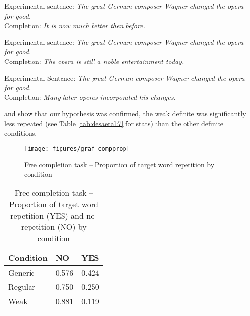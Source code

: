 \documentclass[output=paper,
modfonts
]{langscibook}
\begin{document}
\ea \label{ex:desaetal:11}
{Experimental sentence:} \textit{The great German composer Wagner changed the opera for good.}
\\ {Completion:} \textit{It is now much better then before.} 
\z

\ea \label{ex:desaetal:12}
{Experimental sentence:} \textit{The great German composer Wagner changed the opera for good.}	
\\ {Completion:} \textit{The opera is still a noble entertainment today.}
\z

\ea \label{ex:desaetal:13}
{Experimental Sentence:} \textit{The great German composer Wagner changed the opera for good.}
\\  {Completion:} \textit{Many later operas incorporated his changes.} 
\z

 and  show that our hypothesis was confirmed, the weak definite was significantly less repeated (see Table \ref{tab:desaetal:7} for stats) than the other definite conditions.

\begin{figure}[p]
\centering
\texttt{[image: figures/graf\_compprop]}
\caption{Free completion task -- Proportion of target word repetition by condition}
\label{fig:desaetal:9}
\end{figure}

\begin{table}[p]
\centering
\caption{Free completion task -- Proportion of target word repetition (YES) and no-repetition (NO) by condition}
\label{tab:desaetal:6}
\begin{tabularx}{0.5\textwidth}{XXX}
\lsptoprule
{Condition} & {NO} & {YES} \\
\midrule
Generic & 0.576 & 0.424 \\ 
Regular & 0.750 & 0.250 \\ 
Weak & 0.881 & 0.119 \\
\lspbottomrule
\end{tabularx}
\end{table}
\end{document}
